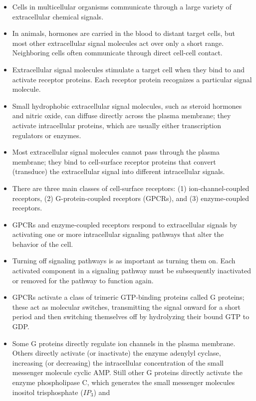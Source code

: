 \begin{itemize}
\item Cells in multicellular organisms communicate through a large variety
of extracellular chemical signals.
\item In animals, hormones are carried in the blood to distant target cells,
but most other extracellular signal molecules act over only a short
range. Neighboring cells often communicate through direct cell-cell
contact.
\item Extracellular signal molecules stimulate a target cell when they bind
to and activate receptor proteins. Each receptor protein recognizes a
particular signal molecule.
\item Small hydrophobic extracellular signal molecules, such as steroid
hormones and nitric oxide, can diffuse directly across the plasma
membrane; they activate intracellular proteins, which are usually
either transcription regulators or enzymes.
\item Most extracellular signal molecules cannot pass through the plasma
membrane; they bind to cell-surface receptor proteins that convert
(transduce) the extracellular signal into different intracellular
signals.
\item There are three main classes of cell-surface receptors: (1) ion-channel-coupled
receptors, (2) G-protein-coupled receptors (GPCRs), and
(3) enzyme-coupled receptors.
\item GPCRs and enzyme-coupled receptors respond to extracellular signals
by activating one or more intracellular signaling pathways that
alter the behavior of the cell.
\item Turning off signaling pathways is as important as turning them on.
Each activated component in a signaling pathway must be subsequently
inactivated or removed for the pathway to function again.
\item GPCRs activate a class of trimeric GTP-binding proteins called G proteins;
these act as molecular switches, transmitting the signal onward
for a short period and then switching themselves off by hydrolyzing
their bound GTP to GDP.
\item Some G proteins directly regulate ion channels in the plasma membrane.
Others directly activate (or inactivate) the enzyme adenylyl
cyclase, increasing (or decreasing) the intracellular concentration
of the small messenger molecule cyclic AMP. Still other G proteins
directly activate the enzyme phospholipase C, which generates
the small messenger molecules inositol trisphosphate ($IP_3$) and

\end{itemize}
